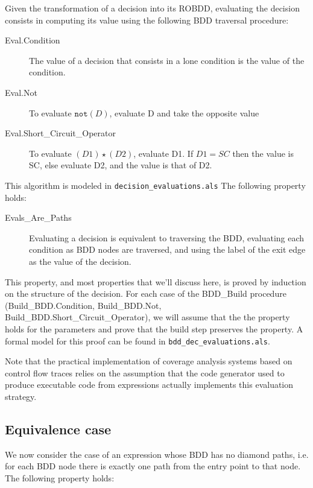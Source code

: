 \documentclass[a4paper,12pt,twoside]{article}
\newcommand{\anysc}{\star}
\newcommand{\adanot}{\texttt{not}}
\begin{document}
Given the transformation of a decision into its ROBDD, evaluating the
decision consists in computing its value using the following BDD traversal
procedure:

\begin{description}
\item[Eval.Condition]
  The value of a decision that consists in a lone condition is the
  value of the condition.

\item[Eval.Not]
  To evaluate $\adanot{} (D)$, evaluate D and take the opposite value

\item[Eval.Short\_Circuit\_Operator]
  To evaluate $(D1) \anysc{} (D2)$, evaluate D1. If $D1 = SC$ then the
  value is SC, else evaluate D2, and the value is that of D2.
\end{description}

This algorithm is modeled in \verb|decision_evaluations.als|
The following property holds:

\begin{description}
\item[Evals\_Are\_Paths]
  Evaluating a decision is equivalent to traversing the BDD, evaluating
  each condition as BDD nodes are traversed, and using the label of the
  exit edge as the value of the decision.
\end{description}

This property, and most properties that we'll discuss here, is proved
by induction on the structure of the decision.  For each case of the
BDD\_Build procedure (Build\_BDD.Condition, Build\_BDD.Not,
Build\_BDD.Short\_Circuit\_Operator), we will assume that the the
property holds for the parameters and prove that the build step
preserves the property. A formal model for this proof can be found
in \verb|bdd_dec_evaluations.als|.

Note that the practical implementation of coverage analysis systems based
on control flow traces relies on the assumption that the code generator
used to produce executable code from expressions actually implements this
evaluation strategy.

\subsection{Equivalence case}

We now consider the case of an expression whose BDD has no diamond paths,
i.e. for each BDD node there is exactly one path from the entry point to
that node. The following property holds:
\end{document}
